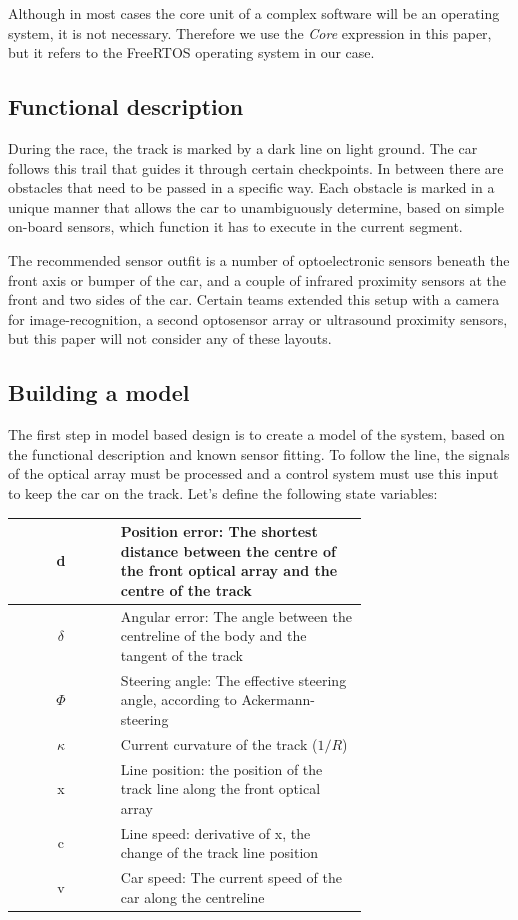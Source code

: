 Although in most cases the core unit of a complex software will be an operating system, it is not necessary. Therefore we use the \emph{Core} expression in this paper, but it refers to the FreeRTOS operating system in our case.

\subsection{Functional description}

During the race, the track is marked by a dark line on light ground. The car follows this trail that guides it through certain checkpoints. In between there are obstacles that need to be passed in a specific way. Each obstacle is marked in a unique manner that allows the car to unambiguously determine, based on simple on-board sensors, which function it has to execute in the current segment.

The recommended sensor outfit\cite{sensors} is a number of optoelectronic sensors beneath the front axis or bumper of the car, and a couple of infrared proximity sensors at the front and two sides of the car. Certain teams extended this setup with a camera for image-recognition, a second optosensor array or ultrasound proximity sensors, but this paper will not consider any of these layouts.

\subsection{Building a model}

The first step in model based design is to create a model of the system, based on the functional description and known sensor fitting. To follow the line, the signals of the optical array must be processed and a control system must use this input to keep the car on the track. Let's define the following state variables:

\begin{center}
  \begin{tabular}{| c | p{0.7\linewidth} |}
\hline
    d & Position error: The shortest distance between the centre of the front optical array and the centre of the track \\ \hline
    $ \delta $ & Angular error: The angle between the centreline of the body and the tangent of the track \\ \hline
    $ \Phi $ & Steering angle: The effective steering angle, according to Ackermann-steering \\
    \hline
    $ \kappa $ & Current curvature of the track ($1/R$) \\ \hline
    x & Line position: the position of the track line along the front optical array \\ \hline
    c & Line speed: derivative of x, the change of the track line position \\ \hline
    v & Car speed: The current speed of the car along the centreline \\
    \hline
  \end{tabular}
\end{center}

